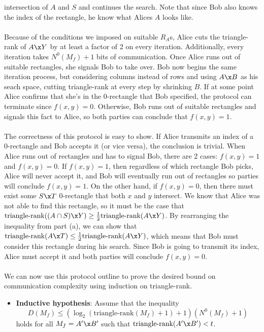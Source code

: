 \documentclass{article}
\newcommand\tr{\textrm{triangle-rank}}
\begin{document}
\begin{enumerate}
\begin{enumerate}
            intersection of $A$ and $S$ and continues the search. Note that
            since Bob also knows the index of the rectangle, he know what
            Alices $A$ looks like.
            \\\\
            Because of the conditions we imposed on suitable $R_A$s, Alice cuts
            the triangle-rank of $A \x Y$ by at least a factor of 2 on every
            iteration. Additionally, every iteration takes $N^0(M_f) + 1$ bits
            of communication. Once Alice runs out of suitable rectangles, she
            signals Bob to take over. Bob now begins the same iteration
            process, but considering columns instead of rows and using $A \x B$
            as his seach space, cutting triangle-rank at every step by
            shrinking $B$. If at some point Alice confirms that she's in the
            0-rectangle that Bob specified, the protocol can terminate since
            $f(x,y) = 0$. Otherwise, Bob runs out of suitable rectangles and
            signals this fact to Alice, so both parties can conclude that
            $f(x,y) = 1$.
            \\\\
            The correctness of this protocol is easy to show. If Alice
            transmits an index of a 0-rectangle and Bob accepts it (or vice
            versa), the conclusion is trivial. When Alice runs out of
            rectangles and has to signal Bob, there are 2 cases: $f(x,y) = 1$
            and $f(x,y) = 0$. If $f(x,y) = 1$, then regardless of which
            rectangle Bob picks, Alice will never accept it, and Bob will
            eventually run out of rectangles so parties will conclude $f(x,y) =
            1$. On the other hand, if $f(x,y) = 0$, then there must exist some
            $S \x T$ 0-rectangle that both $x$ and $y$ intersect. We know
            that Alice was not able to find this rectangle, so it must be the
            case that $\tr((A \cap S) \x Y) \geq \frac{1}{2}\tr(A \x Y)$. By
            rearranging the inequality from part (a), we can show that $\tr(A
            \x T) \leq \frac{1}{2}\tr(A \x Y)$, which means that Bob must
            consider this rectangle during his search. Since Bob is going to
            transmit its index, Alice must accept it and both parties will
            conclude $f(x,y) = 0$.
            \\\\
            We can now use this protocol outline to prove the desired bound on
            communication complexity using induction on triangle-rank.
            \begin{itemize}
                \item \textbf{Inductive hypothesis}: Assume that the inequality
                    $$D(M_f) \leq (\log_2(\tr(M_f) + 1) + 1)
                    (N^0(M_f) + 1)$$ holds for all $M_f = A' \x B'$ such that 
                    $\tr(A' \x B') < t$.
                    \\


\end{itemize}
\end{enumerate}
\end{enumerate}
\end{document}
